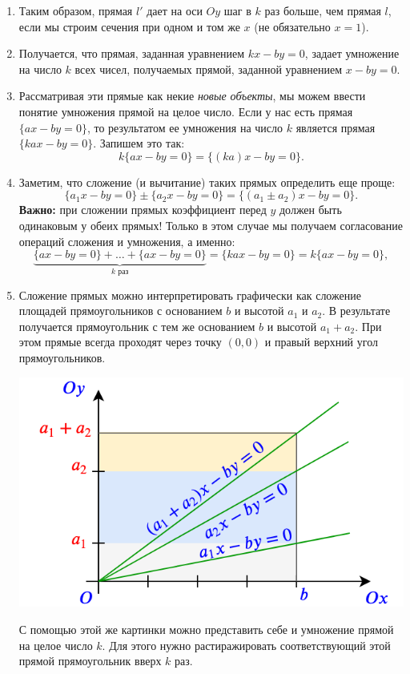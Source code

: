 \begin{enumerate}
\item Таким образом, прямая $l'$ дает на оси $Oy$ шаг в $k$ раз больше, чем прямая $l$, если мы строим сечения при одном и том же $x$ (не обязательно $x=1$).
\item Получается, что прямая, заданная уравнением $kx-by=0$, задает умножение на число $k$ всех чисел, получаемых прямой, заданной уравнением $x-by=0$.
\item Рассматривая эти прямые как некие \textit{новые объекты}, мы можем ввести понятие умножения прямой на целое число. Если у нас есть прямая $\{ax-by=0\}$, то результатом ее умножения на число $k$ является прямая $\{kax-by=0\}$. Запишем это так:
$$
k\{ax-by=0\} = \{(ka)x-by=0\}.
$$
\item Заметим, что сложение (и вычитание) таких прямых определить еще проще: 
$$
\{a_1x-by=0\}\pm\{a_2x-by=0\} = \{(a_1\pm a_2)x-by=0\}.
$$
\textbf{Важно:} при сложении прямых коэффициент перед $y$ должен быть одинаковым у обеих прямых!
Только в этом случае мы получаем согласование операций сложения и умножения, а именно:
$$
\underbrace{\{ax-by=0\}+\dots+\{ax-by=0\}}_{k\mbox{ раз}} = \{kax-by=0\} = k\{ax-by=0\},
$$
\item Сложение прямых можно интерпретировать графически как сложение площадей прямоугольников с основанием $b$ и высотой $a_1$ и $a_2$. В результате получается прямоугольник с тем же основанием $b$ и высотой $a_1+a_2$. При этом прямые всегда проходят через точку $(0,0)$ и правый верхний угол прямоугольников.
\begin{center}
\includegraphics[scale=0.5]{linesum.png}
\end{center}
С помощью этой же картинки можно представить себе и умножение прямой на целое число $k$. Для этого нужно растиражировать соответствующий этой прямой прямоугольник вверх $k$ раз.


\end{enumerate}
